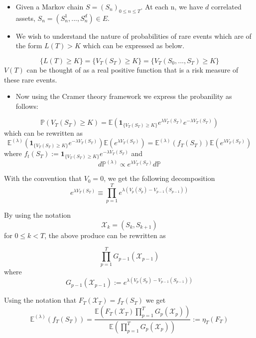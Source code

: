 \begin{frame}
	\begin{itemize}
		\item Given a Markov chain $S=(S_n)_{0 \leq n \leq T}$. At each n, we have 
		      $d$ correlated assets, $S_n = (S_n^1,...,S_n^d) \in \mathit{E}$. 
		\item We wish to understand the nature of probabilities of rare events 
		      which are of the form $L(T) > K$ which can be expressed as below.
	\end{itemize}
	$$
	\{L(T) \geq K\} = \{V_T(S_T)\geq K\} = \{V_T(S_0,...,S_T)\geq K\}
	$$
	$V(T)$ can be thought of as a real positive function that is a risk measure of these rare events.\\
\end{frame}

\begin{frame}
	\begin{itemize}
		\item Now using the Cramer theory framework we express the probanility
		      as follows:
	\end{itemize}
	$$\mathbb{P}(V_T(S_T) \geq K) = \mathbb{E}\left( \mathbf{1}_{\{V_T(S_T) \geq K\}}e^{\lambda V_T(S_T)}e^{-\lambda V_T(S_T)} \right)$$
	which can be rewritten as
	$$\mathbb{E}^{(\lambda)} \left(  \mathbf{1}_{\{V_T(S_T) \geq K\}} e^{-\lambda V_T(S_T)} \right) \mathbb{E} \left(e^{\lambda V_T(S_T)}\right) = 
	\mathbb{E}^{(\lambda)}(f_T(S_T)) \mathbb{E}(e^{\lambda V_T(S_T)})  $$
	where $f_t(S_T) := \mathbf{1}_{\{V_T(S_T) \geq K\}}e^{-\lambda V_T(S_T)}
	$
	and
	$$d\mathbb{P}^{(\lambda)} \propto e^{\lambda V_T(S_T)}d\mathbb{P}$$
\end{frame}
		
\begin{frame}
	With the convention that $V_0 = 0$, we get the following decomposition
	$$e^{\lambda V_T(S_T)} \equiv \prod_{p=1}^{T} e^{\lambda (V_p(S_p) - V_{p-1}(S_{p-1}))}$$
										
	By using the notation $$\mathcal{X}_k = (S_k, S_{k+1})$$ for $0 \leq k < T$, the above produce can be rewritten as
										
	$$\prod_{p=1}^{T} G_{p-1}(\mathcal{X}_{p-1})$$ where
	$$G_{p-1}(\mathcal{X}_{p-1}) := e^{\lambda (V_p(S_p) - V_{p-1}(S_{p-1}))}$$
\end{frame}
\begin{frame}
	Using the notation that $F_T(\mathcal{X}_T) = f_T(S_T)$ we get
	\begin{equation}
		\mathbb{E}^{(\lambda)}(f_T(S_T)) = \frac{\mathbb{E}(F_T(\mathcal{X}_T)\prod_{p=1}^{T}G_p(\mathcal{X}_p))}{\mathbb{E}(\prod_{p=1}^{T}G_p(\mathcal{X}_p))} := \eta_T(F_T)
	\end{equation}
\end{frame}
